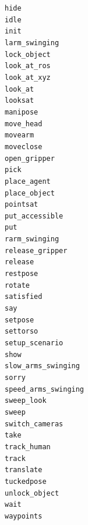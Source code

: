 \documentclass[xcolor=table]{beamer}
\begin{document}
{\begin{frame}{}
\begin{multicols}{4}
{\tt hide} \\
{\tt idle} \\
{\tt init} \\
{\tt larm\_swinging} \\
{\tt lock\_object} \\
{\tt look\_at\_ros} \\
{\tt look\_at\_xyz} \\
{\tt look\_at} \\
{\tt looksat} \\
{\tt manipose} \\
{\tt move\_head} \\
{\tt movearm} \\
{\tt moveclose} \\
{\tt open\_gripper} \\
{\tt pick} \\
{\tt place\_agent} \\
{\tt place\_object} \\
{\tt pointsat} \\
{\tt put\_accessible} \\
{\tt put} \\
{\tt rarm\_swinging} \\
{\tt release\_gripper} \\
{\tt release} \\
{\tt restpose} \\
{\tt rotate} \\
{\tt satisfied} \\
{\tt say} \\
{\tt setpose} \\
{\tt settorso} \\
{\tt setup\_scenario} \\
{\tt show} \\
{\tt slow\_arms\_swinging} \\
{\tt sorry} \\
{\tt speed\_arms\_swinging} \\
{\tt sweep\_look} \\
{\tt sweep} \\
{\tt switch\_cameras} \\
{\tt take} \\
{\tt track\_human} \\
{\tt track} \\
{\tt translate} \\
{\tt tuckedpose} \\
{\tt unlock\_object} \\
{\tt wait} \\
{\tt waypoints} \\
    \end{multicols}
\end{frame}
}
\end{document}
